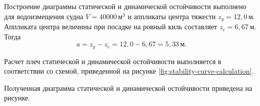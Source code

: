 Построение диаграммы статической и динамической остойчивости выполнено для водоизмещения судна $V = 40000\,\text{м}^3$ и аппликаты центра тяжести $z_g = 12{,}0\,\text{м}$.
Аппликата центра величины при посадке на ровный киль составляет $z_c = 6{,}67\, \text{м}$.
Тогда
\begin{equation*}
    a = z_g - z_c = 12{,}0 - 6{,}67 = 5{,}33\,\text{м}.
\end{equation*}

Расчет плеч статической и динамической остойчивости выполняется в соответствии со схемой, приведенной на рисунке \ref{fig:stability-curve-calculation}.

\begin{table}[H]
    \centering
    \footnotesize
    \caption{Пример расчета диаграммы статической и динамической остойчивости}
    \caption*{\textit{
        В столбце IV выполняется предварительное суммирование для расчета плеча динамической остойчивости.
        В столбце V значения из столбца IV домножаются на $0,5 \Delta\Theta $ (в радианах).
        Схема расчета приведена на рисунке \ref{fig:stability-curve-calculation}.
    }}
\end{table}

Полученная диаграмма статической и динамической остойчивости приведена на рисунке.

